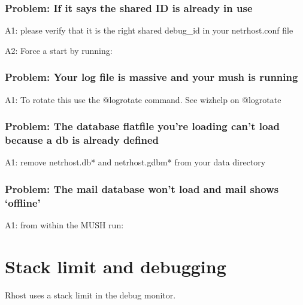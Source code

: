 \documentclass[letterpaper,10pt,english]{sphinxmanual}
\begin{document}
\subsubsection{Problem: If it says the shared ID is already in use}
\label{\detokenize{troubleshooting:problem-if-it-says-the-shared-id-is-already-in-use}}
\sphinxAtStartPar
A1: please verify that it is the right shared debug\_id in your netrhost.conf file

\sphinxAtStartPar
A2: Force a start by running:

\begin{sphinxVerbatim}[commandchars=\\\{\}]
 
\end{sphinxVerbatim}


\subsubsection{Problem: Your log file is massive and your mush is running}
\label{\detokenize{troubleshooting:problem-your-log-file-is-massive-and-your-mush-is-running}}
\sphinxAtStartPar
A1: To rotate this use the @logrotate command. See wizhelp on @logrotate


\subsubsection{Problem: The database flatfile you’re loading can’t load because a db is already defined}
\label{\detokenize{troubleshooting:problem-the-database-flatfile-you-re-loading-can-t-load-because-a-db-is-already-defined}}
\sphinxAtStartPar
A1: remove netrhost.db* and netrhost.gdbm* from your data directory


\subsubsection{Problem: The mail database won’t load and mail shows ‘offline’}
\label{\detokenize{troubleshooting:problem-the-mail-database-won-t-load-and-mail-shows-offline}}
\sphinxAtStartPar
A1: from within the MUSH run:

\begin{sphinxVerbatim}[commandchars=\\\{\}]
\end{sphinxVerbatim}


\section{Stack limit and debugging}
\label{\detokenize{troubleshooting:stack-limit-and-debugging}}
\sphinxAtStartPar
Rhost uses a stack limit in the debug monitor.
\end{document}
